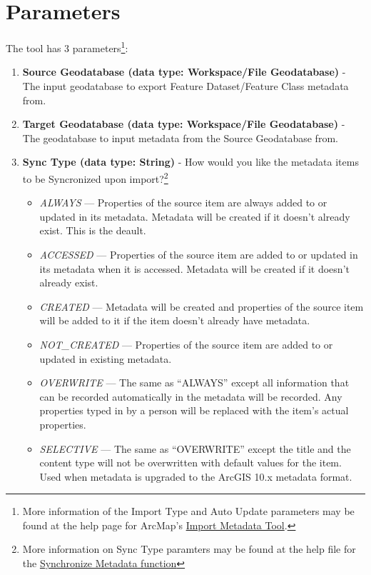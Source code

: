 \documentclass[openany]{book}
\providecommand{\tightlist}{%
  \setlength{\itemsep}{0pt}\setlength{\parskip}{0pt}}
\let\rmarkdownfootnote\footnote%
\def\footnote{\protect\rmarkdownfootnote}
\theoremstyle{definition}
\theoremstyle{definition}
\theoremstyle{definition}
\theoremstyle{remark}
\begin{document}
\section{Parameters}\label{parameters-12}

The tool has 3 parameters\footnote{More information of the Import Type
  and Auto Update parameters may be found at the help page for ArcMap's
  \href{http://desktop.arcgis.com/en/arcmap/latest/tools/conversion-toolbox/import-metadata.htm}{Import
  Metadata Tool}.}:

\begin{enumerate}
\def\labelenumi{\arabic{enumi}.}
\tightlist
\item
  \textbf{Source Geodatabase (data type: Workspace/File Geodatabase)} -
  The input geodatabase to export Feature Dataset/Feature Class metadata
  from.
\item
  \textbf{Target Geodatabase (data type: Workspace/File Geodatabase)} -
  The geodatabase to input metadata from the Source Geodatabase from.
\item
  \textbf{Sync Type (data type: String)} - How would you like the
  metadata items to be Syncronized upon import?\footnote{More
    information on Sync Type paramters may be found at the help file for
    the
    \href{http://desktop.arcgis.com/en/arcmap/latest/tools/conversion-toolbox/synchronize-metadata.htm}{Synchronize
    Metadata function}}

  \begin{itemize}
  \tightlist
  \item
    \emph{ALWAYS} --- Properties of the source item are always added to
    or updated in its metadata. Metadata will be created if it doesn't
    already exist. This is the deault.
  \item
    \emph{ACCESSED} --- Properties of the source item are added to or
    updated in its metadata when it is accessed. Metadata will be
    created if it doesn't already exist.
  \item
    \emph{CREATED} --- Metadata will be created and properties of the
    source item will be added to it if the item doesn't already have
    metadata.
  \item
    \emph{NOT\_CREATED} --- Properties of the source item are added to
    or updated in existing metadata.
  \item
    \emph{OVERWRITE} --- The same as ``ALWAYS'' except all information
    that can be recorded automatically in the metadata will be recorded.
    Any properties typed in by a person will be replaced with the item's
    actual properties.
  \item
    \emph{SELECTIVE} --- The same as ``OVERWRITE'' except the title and
    the content type will not be overwritten with default values for the
    item. Used when metadata is upgraded to the ArcGIS 10.x metadata
    format.
  \end{itemize}
\end{enumerate}
\end{document}

